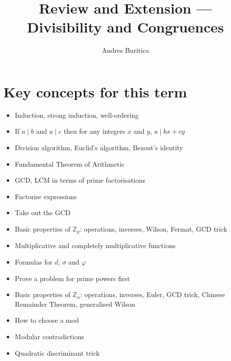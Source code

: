 \documentclass{article}
\title{Review and Extension --- Divisibility and Congruences}
\author{Andres Buritica}
\date{}
\begin{document}
\maketitle
\section{Key concepts for this term}
  \begin{itemize}
    \item Induction, strong induction, well-ordering
    \item If $a\mid b$ and $a\mid c$ then for any integers $x$ and $y$, $a\mid
      bx+cy$
    \item Division algorithm, Euclid's algorithm, Bezout's identity
    \item Fundamental Theorem of Arithmetic
    \item GCD, LCM in terms of prime factorisations
    \item Factorise expressions
    \item Take out the GCD
    \item Basic properties of $\mathbb Z_p$: operations, inverses, Wilson,
      Fermat, GCD trick
    \item Multiplicative and completely multiplicative functions
    \item Formulas for $d$, $\sigma$ and $\varphi$
    \item Prove a problem for prime powers first
    \item Basic properties of $\mathbb Z_n$: operations, inverses, 
      Euler, GCD trick, Chinese Remainder Theorem, generalised Wilson
    \item How to choose a mod
    \item Modular contradictions
    \item Quadratic discriminant trick
  \end{itemize}
\end{document}
